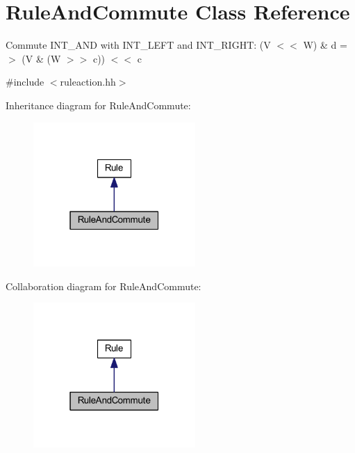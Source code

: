 \hypertarget{class_rule_and_commute}{}\section{Rule\+And\+Commute Class Reference}
\label{class_rule_and_commute}


Commute I\+N\+T\+\_\+\+A\+ND with I\+N\+T\+\_\+\+L\+E\+FT and I\+N\+T\+\_\+\+R\+I\+G\+HT\+: {\ttfamily (V $<$$<$ W) \& d =$>$ (V \& (W $>$$>$ c)) $<$$<$ c}  




{\ttfamily \#include $<$ruleaction.\+hh$>$}



Inheritance diagram for Rule\+And\+Commute\+:
\nopagebreak
\begin{figure}[H]
\begin{center}
\leavevmode
\includegraphics[width=175pt]{class_rule_and_commute__inherit__graph}
\end{center}
\end{figure}


Collaboration diagram for Rule\+And\+Commute\+:
\nopagebreak
\begin{figure}[H]
\begin{center}
\leavevmode
\includegraphics[width=175pt]{class_rule_and_commute__coll__graph}
\end{center}
\end{figure}
